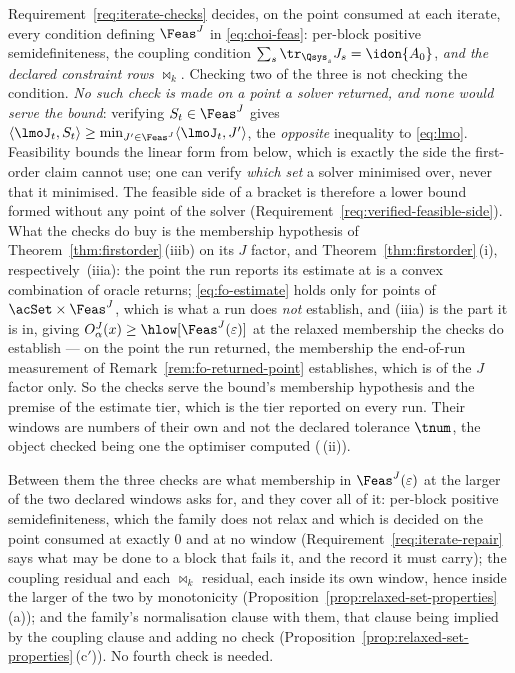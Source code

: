 \begin{remark}\label{rem:fo-iterate-checks}
Requirement~\ref{req:iterate-checks} decides, on the point consumed at each
iterate, every condition defining $\Feas^{J}$ in \eqref{eq:choi-feas}:
per-block positive semidefiniteness, the coupling condition
$\sum_s\tr_{\Qsys_s}J_s=\idon{A_0}$, \emph{and the declared constraint rows}
$\bowtie_k$. Checking two of the three is not checking the condition.
\emph{No such check is made on a point a solver returned, and none would
serve the bound}: verifying $S_t\in\Feas^{J}$ gives
$\langle\lmoJ_t,S_t\rangle\ge\min_{J'\in\Feas^{J}}\langle\lmoJ_t,J'\rangle$,
the \emph{opposite} inequality to \eqref{eq:lmo}. Feasibility bounds the
linear form from below, which is exactly the side the first-order claim
cannot use; one can verify \emph{which set} a solver minimised over, never
that it minimised. The feasible side of a bracket is therefore a lower bound
formed without any point of the solver
(Requirement~\ref{req:verified-feasible-side}). What the checks do buy is
the membership hypothesis of Theorem~\ref{thm:firstorder}\,(iiib) on its
$J$ factor, and Theorem~\ref{thm:firstorder}\,(i),
respectively~(iiia): the point the run reports its estimate at is a convex
combination of oracle returns; \eqref{eq:fo-estimate} holds only for points
of $\acSet\times\Feas^{J}$, which is what a run does \emph{not} establish,
and (iiia) is the part it is in, giving
$O^{J}_{\alpha}(x)\ge\hlow[\Feas^{J}(\varepsilon)]$ at the relaxed
membership the checks do establish --- on the point the run returned, the
membership the end-of-run measurement of
Remark~\ref{rem:fo-returned-point} establishes, which is of the $J$ factor
only. So the checks serve the bound's membership hypothesis and the premise
of the estimate tier, which is the tier reported on every run. Their windows are numbers of their own and not
the declared tolerance $\tnum$, the object checked being one the optimiser
computed (\,(ii)).

Between them the three checks are what membership in
$\Feas^{J}(\varepsilon)$ at the larger of the two declared windows asks
for, and they cover all of it: per-block positive semidefiniteness, which
the family does not relax and which is decided on the point consumed at
exactly $0$ and at no window (Requirement~\ref{req:iterate-repair} says
what may be done to a block that fails it, and the record it must carry);
the coupling residual and each $\bowtie_k$ residual, each inside its own
window, hence inside the larger of the two by monotonicity
(Proposition~\ref{prop:relaxed-set-properties}\,(a)); and the family's
normalisation clause with them, that clause being implied by the coupling
clause and adding no check
(Proposition~\ref{prop:relaxed-set-properties}\,(c$'$)). No fourth check is
needed.


\end{remark}

